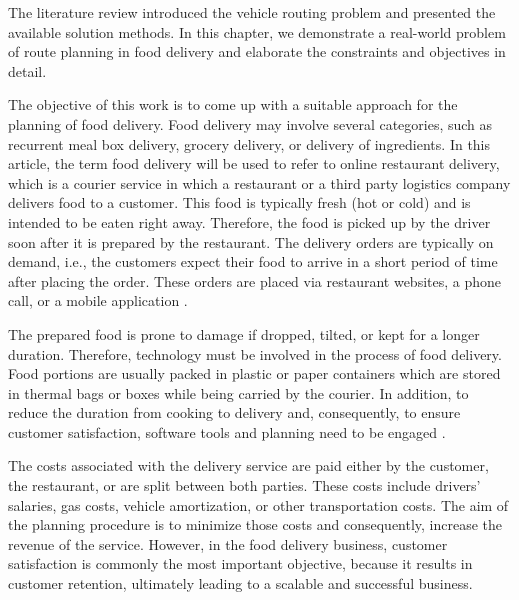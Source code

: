 The literature review introduced the vehicle routing problem and presented the available solution methods. In this chapter, we demonstrate a real-world problem of route planning in food delivery and elaborate the constraints and objectives in detail.

The objective of this work is to come up with a suitable approach for the planning of food delivery. Food delivery may involve several categories, such as recurrent meal box delivery, grocery delivery, or delivery of ingredients. In this article, the term food delivery will be used to refer to online restaurant delivery, which is a courier service in which a restaurant or a third party logistics company delivers food to a customer. This food is typically fresh (hot or cold) and is intended to be eaten right away. Therefore, the food is picked up by the driver soon after it is prepared by the restaurant. The delivery orders are typically on demand, i.e., the customers expect their food to arrive in a short period of time after placing the order. These orders are placed via restaurant websites, a phone call, or a mobile application \cite{food-delivery2020}.

The prepared food is prone to damage if dropped, tilted, or kept for a longer duration. Therefore, technology must be involved in the process of food delivery. Food portions are usually packed in plastic or paper containers which are stored in thermal bags or boxes while being carried by the courier. In addition, to reduce the duration from cooking to delivery and, consequently, to ensure customer satisfaction, software tools and planning need to be engaged \cite{food-delivery2020}.

The costs associated with the delivery service are paid either by the customer, the restaurant, or are split between both parties. These costs include drivers' salaries, gas costs, vehicle amortization, or other transportation costs. The aim of the planning procedure is to minimize those costs and consequently, increase the revenue of the service. However, in the food delivery business, customer satisfaction is commonly the most important objective, because it results in customer retention, ultimately leading to a scalable and successful business.

